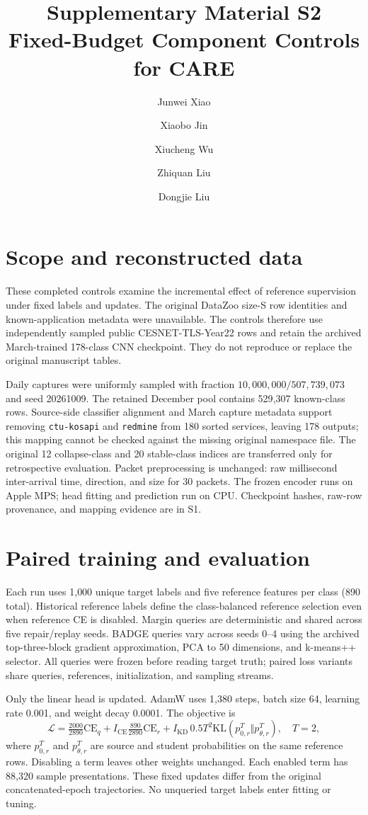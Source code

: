 \documentclass[11pt]{article}
\title{Supplementary Material S2\\Fixed-Budget Component Controls for CARE}
\author{Junwei Xiao \and Xiaobo Jin \and Xiucheng Wu \and Zhiquan Liu \and Dongjie Liu}
\date{}
\begin{document}
\maketitle
\section{Scope and reconstructed data}
These completed controls examine the incremental effect of reference supervision under fixed labels and updates. The original DataZoo size-S row identities and known-application metadata were unavailable. The controls therefore use independently sampled public CESNET-TLS-Year22 rows and retain the archived March-trained 178-class CNN checkpoint. They do not reproduce or replace the original manuscript tables.

Daily captures were uniformly sampled with fraction $10{,}000{,}000/507{,}739{,}073$ and seed 20261009. The retained December pool contains 529{,}307 known-class rows. Source-side classifier alignment and March capture metadata support removing \texttt{ctu-kosapi} and \texttt{redmine} from 180 sorted services, leaving 178 outputs; this mapping cannot be checked against the missing original namespace file. The original 12 collapse-class and 20 stable-class indices are transferred only for retrospective evaluation. Packet preprocessing is unchanged: raw millisecond inter-arrival time, direction, and size for 30 packets. The frozen encoder runs on Apple MPS; head fitting and prediction run on CPU. Checkpoint hashes, raw-row provenance, and mapping evidence are in S1.

\section{Paired training and evaluation}
Each run uses 1{,}000 unique target labels and five reference features per class (890 total). Historical reference labels define the class-balanced reference selection even when reference CE is disabled. Margin queries are deterministic and shared across five repair/replay seeds. BADGE queries vary across seeds 0--4 using the archived top-three-block gradient approximation, PCA to 50 dimensions, and k-means++ selector. All queries were frozen before reading target truth; paired loss variants share queries, references, initialization, and sampling streams.

Only the linear head is updated. AdamW uses 1{,}380 steps, batch size 64, learning rate 0.001, and weight decay 0.0001. The objective is
\[
\mathcal L=\tfrac{2000}{2890}\mathrm{CE}_{q}
 +I_{\mathrm{CE}}\tfrac{890}{2890}\mathrm{CE}_{r}
 +I_{\mathrm{KD}}\,0.5T^2\mathrm{KL}(p_{0,r}^{T}\Vert p_{\theta,r}^{T}),\quad T=2,
\]
where $p_{0,r}^{T}$ and $p_{\theta,r}^{T}$ are source and student probabilities on the same reference rows. Disabling a term leaves other weights unchanged. Each enabled term has 88{,}320 sample presentations. These fixed updates differ from the original concatenated-epoch trajectories. No unqueried target labels enter fitting or tuning.
\end{document}
